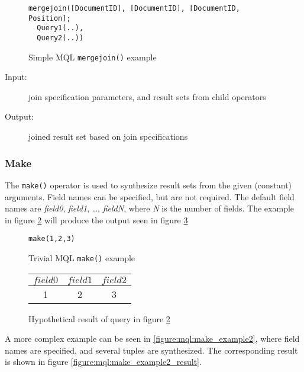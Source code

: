 \begin{figure}[!h]
\centering
\begin{Verbatim}
mergejoin([DocumentID], [DocumentID], [DocumentID, Position]; 
  Query1(..),
  Query2(..))
\end{Verbatim}
\caption{Simple MQL \texttt{mergejoin()} example}
\label{figure:mql:mergejoin_example}
\end{figure}

\begin{description}
  \item[Input:] join specification parameters, and result sets from child
operators
  \item[Output:] joined result set based on join specifications
\end{description}

\subsubsection{Make}
The \texttt{make()} operator is used to synthesize result sets from the given
(constant) arguments. Field names can be specified, but are not required. The
default field names are \textit{field0}, \textit{field1}, \ldots,
\textit{fieldN}, where \textit{N} is the number of fields. The example in
figure \ref{figure:mql:make_example1} will produce the output seen in figure
\ref{figure:mql:make_example1_result}

\begin{figure}[!h]
\centering
\begin{Verbatim}
make(1,2,3)
\end{Verbatim}
\caption{Trivial MQL \texttt{make()} example}
\label{figure:mql:make_example1}
\end{figure}

\begin{figure}[!h]
\centering
\begin{tabular}{|c | c | c |}
\hline
$field0$ & $field1$ & $field2$ \\ \hline
1 & 2 & 3 \\ \hline
\end{tabular}
\caption{Hypothetical result of query in figure
\ref{figure:mql:make_example1}}
\label{figure:mql:make_example1_result}
\end{figure}

A more complex example can be seen in \ref{figure:mql:make_example2}, where
field names are specified, and several tuples are synthesized. The
corresponding result is shown in figure \ref{figure:mql:make_example2_result}.

